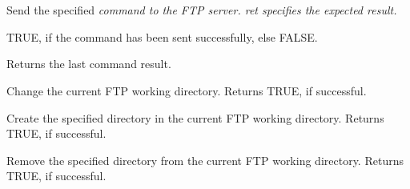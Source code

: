 \section{}\label{wxftp}









Send the specified \it{command} to the FTP server. \it{ret} specifies
the expected result.


TRUE, if the command has been sent successfully, else FALSE.




Returns the last command result.




Change the current FTP working directory.
Returns TRUE, if successful.



Create the specified directory in the current FTP working directory.
Returns TRUE, if successful.



Remove the specified directory from the current FTP working directory.
Returns TRUE, if successful.

